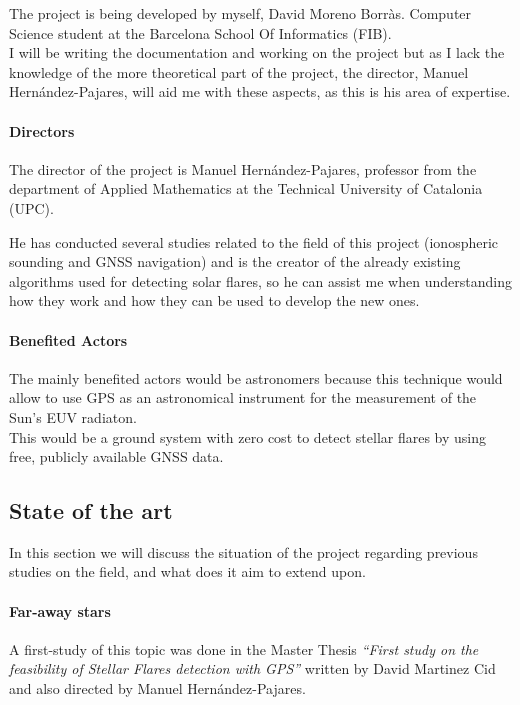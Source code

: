 \documentclass[12pt]{article}
\begin{document}
The project is being developed by myself, David Moreno Borràs. Computer Science student at the Barcelona School Of Informatics (FIB).\\

I will be writing the documentation and working on the project but as I lack the knowledge of the more theoretical part of the project, the director, Manuel Hernández-Pajares, will aid me with these aspects, as this is his area of expertise.

\paragraph{Directors}

The director of the project is Manuel Hernández-Pajares, professor from the department of Applied Mathematics at the Technical University of Catalonia (UPC). 

He has conducted several studies related to the field of this project (ionospheric sounding and GNSS navigation) and is the creator of the already existing algorithms used for detecting solar flares, so he can assist me when understanding how they work and how they can be used to develop the new ones.

\paragraph{Benefited Actors}

The mainly benefited actors would be astronomers because this technique would allow to use GPS as an astronomical instrument for the measurement of the Sun’s EUV radiaton.\\

This would be a ground system with zero cost to detect stellar flares by using free, publicly available GNSS data.

\subsection{State of the art}

In this section we will discuss the situation of the project regarding previous studies on the field, and what does it aim to extend upon.          

\paragraph{Far-away stars}

A first-study of this topic was done in the Master Thesis \textit{“First study on the feasibility of Stellar Flares detection with GPS”} \cite{martinez2016first} written by David Martinez Cid and also directed by Manuel Hernández-Pajares.\\
\end{document}
